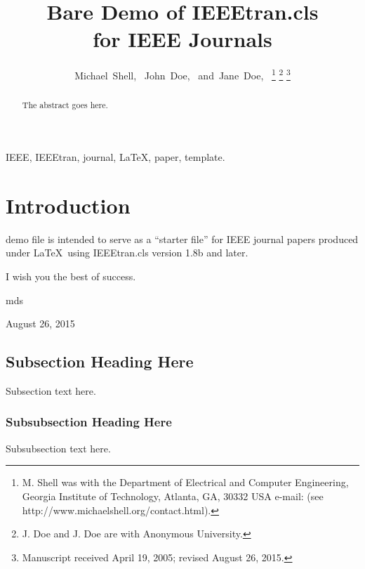 \documentclass[journal]{IEEEtran}
\begin{document}
\title{Bare Demo of IEEEtran.cls\\ for IEEE Journals}

\author{Michael~Shell,~
        John~Doe,~
        and~Jane~Doe,~%
\thanks{M. Shell was with the Department
of Electrical and Computer Engineering, Georgia Institute of Technology, Atlanta,
GA, 30332 USA e-mail: (see http://www.michaelshell.org/contact.html).}%
\thanks{J. Doe and J. Doe are with Anonymous University.}%
\thanks{Manuscript received April 19, 2005; revised August 26, 2015.}}

\maketitle

\begin{abstract}
The abstract goes here.
\end{abstract}

\begin{IEEEkeywords}
IEEE, IEEEtran, journal, \LaTeX, paper, template.
\end{IEEEkeywords}

\IEEEpeerreviewmaketitle

\section{Introduction}

 demo file is intended to serve as a ``starter file''
for IEEE journal papers produced under \LaTeX\ using
IEEEtran.cls version 1.8b and later.

I wish you the best of success.

\hfill mds
 
\hfill August 26, 2015

\subsection{Subsection Heading Here}
Subsection text here.


\subsubsection{Subsubsection Heading Here}
Subsubsection text here.
\end{document}
